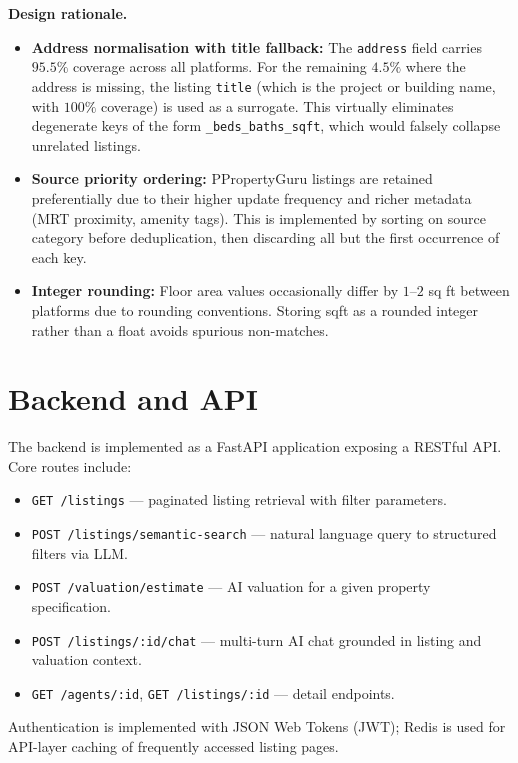\noindent\textbf{Design rationale.}
\begin{itemize}
    \item \textbf{Address normalisation with title fallback:} The \texttt{address} field carries $95.5\%$ coverage across all platforms. For 
    the remaining $4.5\%$ where the address is missing, the listing \texttt{title} 
    (which is the project or building name, with $100\%$ coverage) is used as a 
    surrogate. This virtually eliminates degenerate keys of the form 
    \texttt{\_beds\_baths\_sqft}, which would falsely collapse unrelated listings.
    \item \textbf{Source priority ordering:} PPropertyGuru listings are retained preferentially due to their higher update 
    frequency and richer metadata (MRT proximity, amenity tags). This is 
    implemented by sorting on source category before deduplication, then 
    discarding all but the first occurrence of each key.
    \item \textbf{Integer rounding:} Floor area values occasionally differ by $1$--$2$ sq ft between platforms due 
    to rounding conventions. Storing sqft as a rounded integer rather than a float 
    avoids spurious non-matches.
\end{itemize}

\section{Backend and API}

The backend is implemented as a FastAPI application exposing a RESTful API. Core
routes include:

\begin{itemize}
    \item \texttt{GET /listings} — paginated listing retrieval with filter parameters.
    \item \texttt{POST /listings/semantic-search} — natural language query to structured filters via LLM.
    \item \texttt{POST /valuation/estimate} — AI valuation for a given property specification.
    \item \texttt{POST /listings/:id/chat} — multi-turn AI chat grounded in listing and valuation context.
    \item \texttt{GET /agents/:id}, \texttt{GET /listings/:id} — detail endpoints.
\end{itemize}

Authentication is implemented with JSON Web Tokens (JWT); Redis is used for API-layer
caching of frequently accessed listing pages.


